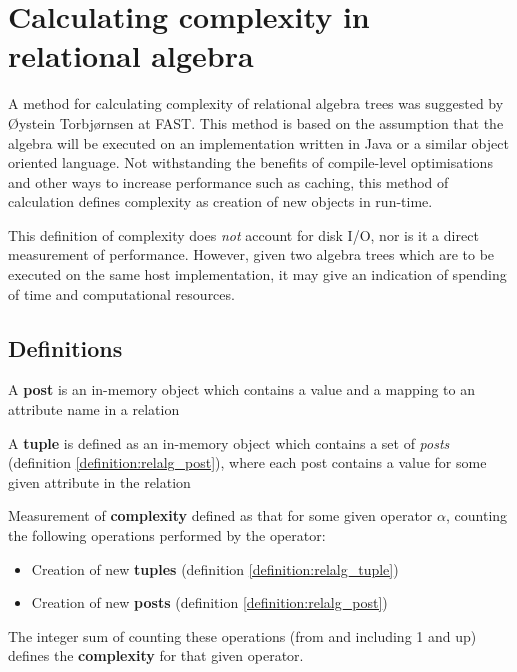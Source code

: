 \section{Calculating complexity in relational algebra}
A method for calculating complexity of relational algebra trees was suggested
by \O ystein Torbj\o rnsen at FAST. This method is based on the assumption
that the algebra will be executed on an implementation written in Java or a
similar object oriented language. Not withstanding the benefits of compile-level
optimisations and other ways to increase performance such as caching, this
method of calculation defines complexity as creation of new objects in run-time. 

This definition of complexity does \textit{not} account
for disk I/O, nor is it a direct measurement of performance. However, given
two algebra trees which are to be executed on the same host implementation, it
may give an indication of spending of time and computational resources.

\subsection{Definitions}
\begin{myDefinition}
A \textbf{post} is an in-memory object which contains a value and a mapping to
an attribute name in a relation
\label{definition:relalg_post}
\end{myDefinition}

\begin{myDefinition}
A \textbf{tuple} is defined as an in-memory object which contains a set of
\textit{posts} (definition \ref{definition:relalg_post}), where each post
contains a value for some given attribute in the relation
\label{definition:relalg_tuple}
\end{myDefinition}

\begin{myDefinition}
Measurement of \textbf{complexity} defined as that for some given operator
$\alpha$, counting the following operations performed by the operator:
\begin{itemize}
  \item Creation of new \textbf{tuples} (definition
  \ref{definition:relalg_tuple})
  \item Creation of new \textbf{posts} (definition \ref{definition:relalg_post})
\end{itemize}
The integer sum of counting these operations (from and including 1 and up)
defines the \textbf{complexity} for that given operator.
\label{definition:relalg_complexity}
\end{myDefinition}